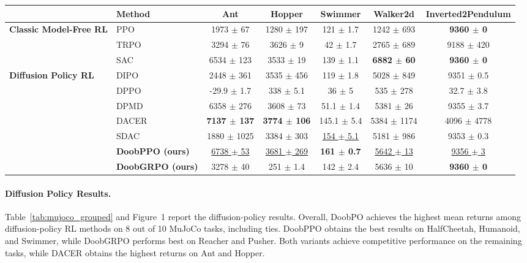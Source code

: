 \begin{table}[t]
\begin{adjustbox}{max width=\textwidth}
{\begin{tabular}{llccccc}
\midrule

& Method
& Ant
& Hopper
& Swimmer
& Walker2d
& Inverted2Pendulum \\
\midrule

\multirow{3}{*}{\textbf{Classic Model-Free RL}}
& PPO
& 1973 $\pm$ 67
& 1280 $\pm$ 197
& 121 $\pm$ 1.7
& 1242 $\pm$ 693
& \textbf{9360 $\pm$ 0} \\

& TRPO
& 3294 $\pm$ 76
& 3626 $\pm$ 9
& 42 $\pm$ 1.7
& 2765 $\pm$ 689
& 9188 $\pm$ 420 \\

& SAC
& 6534 $\pm$ 123
& 3533 $\pm$ 19
& 139 $\pm$ 1.1
& \textbf{6882 $\pm$ 60}
& \textbf{9360 $\pm$ 0} \\

\midrule

\multirow{7}{*}{\textbf{Diffusion Policy RL}}
& DIPO
& 2448 $\pm$ 361
& 3535 $\pm$ 456
& 119 $\pm$ 1.8
& 5028 $\pm$ 849
& 9351 $\pm$ 0.5 \\

& DPPO
& -29.9 $\pm$ 1.7
& 338 $\pm$ 5.1
& 36 $\pm$ 5
& 535 $\pm$ 278
& 32.7 $\pm$ 3.8 \\

& DPMD
& 6358 $\pm$ 276
& 3608 $\pm$ 73
& 51.1 $\pm$ 1.4
& 5381 $\pm$ 26
& 9355 $\pm$ 3.7 \\

& DACER
& \textbf{7137 $\pm$ 137}
& \textbf{3774 $\pm$ 106}
& 145.1 $\pm$ 5.4
& 5384 $\pm$ 1174
& 4096 $\pm$ 4778 \\

& SDAC
& 1880 $\pm$ 1025
& 3384 $\pm$ 303
& \underline{154 $\pm$ 5.1}
& 5181 $\pm$ 986
& 9353 $\pm$ 0.3 \\

& \textbf{DoobPPO (ours)}
& \underline{6738 $\pm$ 53}
& \underline{3681 $\pm$ 269}
& \textbf{161 $\pm$ 0.7}
& \underline{5642 $\pm$ 13}
& \underline{9356 $\pm$ 3} \\

& \textbf{DoobGRPO (ours)}
& 3278 $\pm$ 40
& 251 $\pm$ 1.4
& 142 $\pm$ 2.4
& 5636 $\pm$ 10
& \textbf{9360 $\pm$ 0} \\

\bottomrule
\end{tabular}}
\end{adjustbox}
\end{table}

\paragraph{Diffusion Policy Results.}
Table~\ref{tab:mujoco_grouped} and Figure~1 report the
diffusion-policy results.
Overall, DoobPO achieves the highest mean returns among
diffusion-policy RL methods on 8 out of 10 MuJoCo tasks,
including ties.
DoobPPO obtains the best results on HalfCheetah, Humanoid,
and Swimmer, while DoobGRPO performs best on Reacher
and Pusher.
Both variants achieve competitive performance on the
remaining tasks, while DACER obtains the highest returns
on Ant and Hopper.

